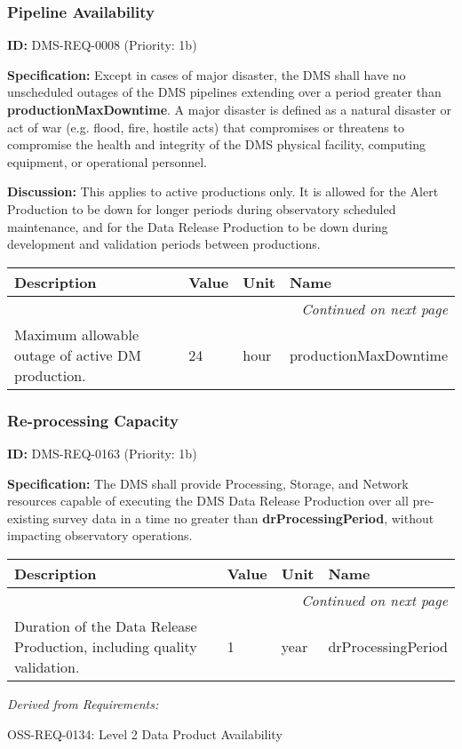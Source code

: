 \documentclass[SE,toc,lsstdraft]{lsstdoc}
\makeatletter
\newcommand{\paramname}[1]{\hspace{0pt}#1}
\newcommand{\unitname}[1]{\hspace{0pt}#1}
\newenvironment{parameters}[0]{%
\setlength\LTleft{0pt}
\setlength\LTright{\fill}
\begin{small}
\begin{longtable}[]{|p{0.49\textwidth}|l|p{0.6in}|p{1.70in}@{}|}

\hline \textbf{Description} & \textbf{Value} & \textbf{Unit} & \textbf{Name} \\ \hline
\endhead

\hline \multicolumn{4}{r}{\emph{Continued on next page}} \\
\endfoot

\hline\hline
\endlastfoot
}{%
\hline
\end{longtable}
\end{small}
}
\makeatother
\begin{document}
\subsubsection{Pipeline Availability}

\label{DMS-REQ-0008}
\textbf{ID:} DMS-REQ-0008 (Priority: 1b)

\textbf{Specification:} Except in cases of major disaster, the DMS shall have no unscheduled outages of the DMS pipelines extending over a period greater than \textbf{productionMaxDowntime}.  A major disaster is defined as a natural disaster or act of war (e.g. flood, fire, hostile acts) that compromises or threatens to compromise the health and integrity of the DMS physical facility, computing equipment, or operational personnel.

\textbf{Discussion:} This applies to active productions only. It is allowed for the Alert Production to be down for longer periods during observatory scheduled maintenance, and for the Data Release Production to be down during development and validation periods between productions.

\begin{parameters}
Maximum allowable outage of active DM production.
&
24
&
\unitname{%
hour
}
&
\paramname{%
productionMaxDowntime
} \\\hline
\end{parameters}

\subsubsection{Re-processing Capacity}

\label{DMS-REQ-0163}
\textbf{ID:} DMS-REQ-0163 (Priority: 1b)

\textbf{Specification:} The DMS shall provide Processing, Storage, and Network resources capable of executing the DMS Data Release Production over all pre-existing survey data in a time no greater than \textbf{drProcessingPeriod}, without impacting observatory operations.

\begin{parameters}
Duration of the Data Release Production, including quality validation.
&
1
&
\unitname{%
year
}
&
\paramname{%
drProcessingPeriod
} \\\hline
\end{parameters}

\emph{Derived from Requirements:}

OSS-REQ-0134:
Level 2 Data Product Availability \newline
\end{document}
